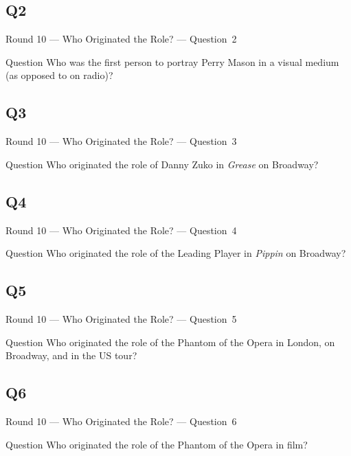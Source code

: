 \documentclass[11pt]{beamer}
\begin{document}
\subsection*{Q2}
\begin{frame}[t]{Round 10 --- Who Originated the Role? --- \mbox{Question 2}}
\vspace{-0.5em}
\begin{block}{Question}
Who was the first person to portray Perry Mason in a visual medium (as opposed to on radio)?
\end{block}
\end{frame}
\subsection*{Q3}
\begin{frame}[t]{Round 10 --- Who Originated the Role? --- \mbox{Question 3}}
\vspace{-0.5em}
\begin{block}{Question}
Who originated the role of Danny Zuko in \emph{Grease} on Broadway?
\end{block}
\end{frame}
\subsection*{Q4}
\begin{frame}[t]{Round 10 --- Who Originated the Role? --- \mbox{Question 4}}
\vspace{-0.5em}
\begin{block}{Question}
Who originated the role of the Leading Player in \emph{Pippin} on Broadway?
\end{block}
\end{frame}
\subsection*{Q5}
\begin{frame}[t]{Round 10 --- Who Originated the Role? --- \mbox{Question 5}}
\vspace{-0.5em}
\begin{block}{Question}
Who originated the role of the Phantom of the Opera in London, on Broadway, and in the US tour?
\end{block}
\end{frame}
\subsection*{Q6}
\begin{frame}[t]{Round 10 --- Who Originated the Role? --- \mbox{Question 6}}
\vspace{-0.5em}
\begin{block}{Question}
Who originated the role of the Phantom of the Opera in film?
\end{block}
\end{frame}
\end{document}
